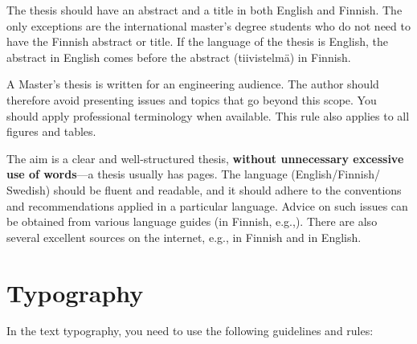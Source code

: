 The thesis should have an abstract and a title in both English and
Finnish. The only exceptions are the international master’s degree
students who do not need to have the Finnish abstract or title. If
the language of the thesis is English, the abstract in English comes
before the abstract (tiivistelmä) in Finnish.

A Master’s thesis is written for an engineering audience. The author
should therefore avoid presenting issues and topics that go beyond
this scope. You should apply professional terminology when available.
This rule also applies to all figures and tables.

The aim is a clear and well-structured thesis, \textbf{without
unnecessary excessive use of words}---a thesis usually has \DIFdelbegin {}\DIFdelend \DIFaddbegin {}\DIFaddend pages. The language (English/Finnish/ Swedish) should be fluent and
readable, and it should adhere to the conventions and recommendations
applied in a particular language. Advice on such issues can be
obtained from various language guides (in Finnish,
e.g.,\DIFaddbegin \DIFadd{~}\DIFaddend \cite{maamies}). There are also several excellent sources on
the internet, e.g.,\DIFaddbegin \DIFadd{~}\DIFaddend \cite{korpela, kielitoimisto} in Finnish
and\DIFaddbegin \DIFadd{~}\DIFaddend \cite{reportwriting, englishlanguage} in English.

\section{Typography}

In the text typography, you need to use the following guidelines and rules:
\DIFdelbegin %
\DIFdel{=}%
\DIFdel{=}%
\DIFdelend 

